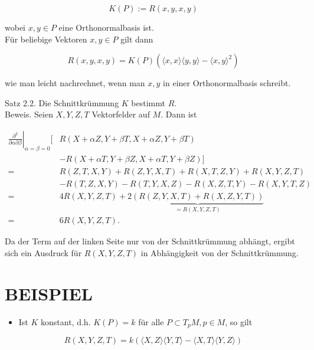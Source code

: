 \documentclass[10pt, letterpaper]{article}
\begin{document}
$$
K(P):=R(x, y, x, y)
$$

wobei $x, y \in P$ eine Orthonormalbasis ist.\\
Für beliebige Vektoren $x, y \in P$ gilt dann

$$
R(x, y, x, y)=K(P)\left(\langle x, x\rangle\langle y, y\rangle-\langle x, y\rangle^{2}\right)
$$

wie man leicht nachrechnet, wenn man $x, y$ in einer Orthonormalbasis schreibt.

Satz 2.2. Die Schnittkrümmung $K$ bestimmt $R$.\\
Beweis. Seien $X, Y, Z, T$ Vektorfelder auf $M$. Dann ist

$$
\begin{aligned}
\left.\frac{\partial^{2}}{\partial \alpha \partial \beta}\right|_{\alpha=\beta=0}[ & R(X+\alpha Z, Y+\beta T, X+\alpha Z, Y+\beta T) \\
& -R(X+\alpha T, Y+\beta Z, X+\alpha T, Y+\beta Z)] \\
= & R(Z, T, X, Y)+R(Z, Y, X, T)+R(X, T, Z, Y)+R(X, Y, Z, T) \\
& -R(T, Z, X, Y)-R(T, Y, X, Z)-R(X, Z, T, Y)-R(X, Y, T, Z) \\
= & 4 R(X, Y, Z, T)+2 \underbrace{(R(Z, Y, X, T)+R(X, Z, Y, T))}_{=R(X, Y, Z, T)} \\
= & 6 R(X, Y, Z, T) .
\end{aligned}
$$

Da der Term auf der linken Seite nur von der Schnittkrümmung abhängt, ergibt sich ein Ausdruck für $R(X, Y, Z, T)$ in Abhängigkeit von der Schnittkrümmung.

\section*{BEISPIEL}
\begin{itemize}
  \item Ist $K$ konstant, d.h. $K(P)=k$ für alle $P \subset T_{p} M, p \in M$, so gilt
\end{itemize}

$$
R(X, Y, Z, T)=k(\langle X, Z\rangle\langle Y, T\rangle-\langle X, T\rangle\langle Y, Z\rangle)
$$
\end{document}
